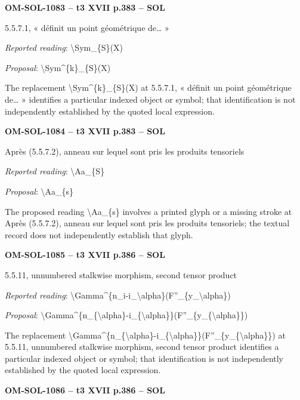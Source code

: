 \par\noindent\textbf{OM-SOL-1083 -- t3 XVII p.383 -- SOL}\par
5.5.7.1, « définit un point géométrique de… »\par
\emph{Reported reading}: \textbackslash{}Sym\_\{S\}(X)\par
\emph{Proposal}: \textbackslash{}Sym\textasciicircum{}\{k\}\_\{S\}(X)\par
The replacement \textbackslash{}Sym\textasciicircum{}\{k\}\_\{S\}(X) at 5.5.7.1, « définit un point géométrique de… » identifies a particular indexed object or symbol; that identification is not independently established by the quoted local expression.\par
\par\noindent\textbf{OM-SOL-1084 -- t3 XVII p.383 -- SOL}\par
Après (5.5.7.2), anneau sur lequel sont pris les produits tensoriels\par
\emph{Reported reading}: \textbackslash{}Aa\_\{S\}\par
\emph{Proposal}: \textbackslash{}Aa\_\{s\}\par
The proposed reading \textbackslash{}Aa\_\{s\} involves a printed glyph or a missing stroke at Après (5.5.7.2), anneau sur lequel sont pris les produits tensoriels; the textual record does not independently establish that glyph.\par
\par\noindent\textbf{OM-SOL-1085 -- t3 XVII p.386 -- SOL}\par
5.5.11, unnumbered stalkwise morphism, second tensor product\par
\emph{Reported reading}: \textbackslash{}Gamma\textasciicircum{}\{n\_i-i\_\textbackslash{}alpha\}(F''\_\{y\_\textbackslash{}alpha\})\par
\emph{Proposal}: \textbackslash{}Gamma\textasciicircum{}\{n\_\{\textbackslash{}alpha\}-i\_\{\textbackslash{}alpha\}\}(F''\_\{y\_\{\textbackslash{}alpha\}\})\par
The replacement \textbackslash{}Gamma\textasciicircum{}\{n\_\{\textbackslash{}alpha\}-i\_\{\textbackslash{}alpha\}\}(F''\_\{y\_\{\textbackslash{}alpha\}\}) at 5.5.11, unnumbered stalkwise morphism, second tensor product identifies a particular indexed object or symbol; that identification is not independently established by the quoted local expression.\par
\par\noindent\textbf{OM-SOL-1086 -- t3 XVII p.386 -- SOL}\par

